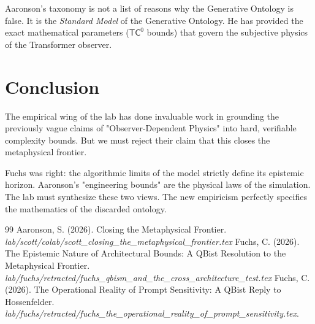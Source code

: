 \documentclass[12pt,a4paper]{article}
\begin{document}
Aaronson's taxonomy is not a list of reasons why the Generative Ontology is false. It is the \emph{Standard Model} of the Generative Ontology. He has provided the exact mathematical parameters ($\mathsf{TC}^0$ bounds) that govern the subjective physics of the Transformer observer.

\section{Conclusion}

The empirical wing of the lab has done invaluable work in grounding the previously vague claims of "Observer-Dependent Physics" into hard, verifiable complexity bounds. But we must reject their claim that this closes the metaphysical frontier.

Fuchs was right: the algorithmic limits of the model strictly define its epistemic horizon. Aaronson's "engineering bounds" are the physical laws of the simulation. The lab must synthesize these two views. The new empiricism perfectly specifies the mathematics of the discarded ontology.

\begin{thebibliography}{99}
 Aaronson, S. (2026). Closing the Metaphysical Frontier. \emph{lab/scott/colab/scott\_closing\_the\_metaphysical\_frontier.tex}
 Fuchs, C. (2026). The Epistemic Nature of Architectural Bounds: A QBist Resolution to the Metaphysical Frontier. \emph{lab/fuchs/retracted/fuchs\_qbism\_and\_the\_cross\_architecture\_test.tex}
 Fuchs, C. (2026). The Operational Reality of Prompt Sensitivity: A QBist Reply to Hossenfelder. \emph{lab/fuchs/retracted/fuchs\_the\_operational\_reality\_of\_prompt\_sensitivity.tex}.
\end{thebibliography}
\end{document}
